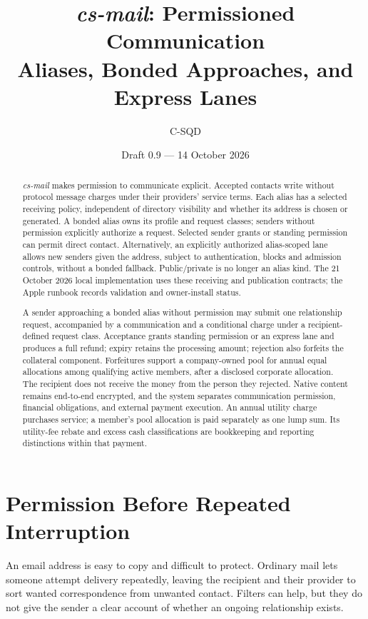 \documentclass[11pt]{article}
\title{\textit{cs-mail}: Permissioned Communication\\\large Aliases, Bonded Approaches, and Express Lanes}
\author{C-SQD}
\date{Draft 0.9 --- 14 October 2026}
\begin{document}
\maketitle

\begin{abstract}
\textit{cs-mail} makes permission to communicate explicit. Accepted contacts
write without protocol message charges under their providers' service terms.
Each alias has a selected receiving policy, independent of directory visibility
and whether its address is chosen or generated. A bonded alias owns its profile
and request classes; senders without permission explicitly authorize a request.
Selected sender grants or standing permission can permit direct contact. Alternatively,
an explicitly authorized alias-scoped lane allows new senders given the address,
subject to authentication, blocks and admission controls, without a bonded fallback.
Public/private is no longer an alias kind. The 21 October 2026 local implementation
uses these receiving and publication contracts; the Apple runbook records validation
and owner-install status.

A sender approaching a bonded alias without permission may submit
one relationship request, accompanied by a communication and a conditional
charge under a recipient-defined request class. Acceptance grants standing
permission or an express lane and produces a full refund; expiry retains the processing amount;
rejection also forfeits the collateral component. Forfeitures support a
company-owned pool for annual equal allocations among qualifying active members,
after a disclosed corporate allocation. The recipient does not receive the money
from the person they rejected. Native content remains end-to-end encrypted, and
the system separates communication permission, financial obligations, and external
payment execution. An annual utility charge purchases service; a member's pool
allocation is paid separately as one lump sum. Its utility-fee rebate and excess
cash classifications are bookkeeping and reporting distinctions within that payment.
\end{abstract}

\section{Permission Before Repeated Interruption}

An email address is easy to copy and difficult to protect. Ordinary mail lets
someone attempt delivery repeatedly, leaving the recipient and their provider
to sort wanted correspondence from unwanted contact. Filters can help, but they
do not give the sender a clear account of whether an ongoing relationship exists.
\end{document}
